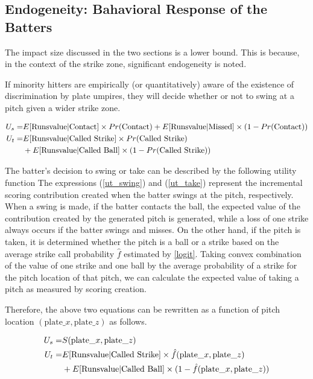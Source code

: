 \documentclass[dvipdfmx, 12pt]{jsarticle}
\begin{document}
\subsection{Endogeneity: Bahavioral Response of the Batters}

The impact size discussed in the two sections is a lower bound. This is because, in the context of the strike zone, significant endogeneity is noted.

If minority hitters are empirically (or quantitatively) aware of the existence of discrimination by plate umpires, they will decide whether or not to swing at a pitch given a wider strike zone.

\begin{align}
  U_s = & E[\text{Runsvalue} | \text{Contact}] \times Pr(\text{Contact}) + E[\text{Runsvalue} | \text{Missed}] \times (1 - Pr(\text{Contact}))\label{ut_swing} \\
  U_t = & E[\text{Runsvalue} | \text{Called Strike}] \times Pr(\text{Called Strike}) \notag \\
  & + E[\text{Runsvalue} | \text{Called Ball}] \times (1 - Pr(\text{Called Strike})) \label{ut_take}
\end{align}

The batter's decision to swing or take can be described by the following utility function The expressions (\ref{ut_swing}) and (\ref{ut_take}) represent the incremental scoring contribution created when the batter swings at the pitch, respectively. When a swing is made, if the batter contacts the ball, the expected value of the contribution created by the generated pitch is generated, while a loss of one strike always occurs if the batter swings and misses. On the other hand, if the pitch is taken, it is determined whether the pitch is a ball or a strike based on the average strike call probability $\hat{f}$ estimated by \ref{logit}. Taking convex combination of the value of one strike and one ball by the average probability of a strike for the pitch location of that pitch, we can calculate the expected value of taking a pitch as measured by scoring creation.

Therefore, the above two equations can be rewritten as a function of pitch location $(\text{plate}\_x, \text{plate}\_z)$ as follows.

\begin{align}
  U_s = & S(\text{plate}\_x, \text{plate}\_z) \label{swingvalue} \\
  U_t = & E[\text{Runsvalue} | \text{Called Strike}] \times \hat{f}(\text{plate}\_x, \text{plate}\_z)\notag \\
  & + E[\text{Runsvalue} | \text{Called Ball}] \times (1 - \hat{f}(\text{plate}\_x, \text{plate}\_z)) \label{takingvalue}
\end{align}
\end{document}
